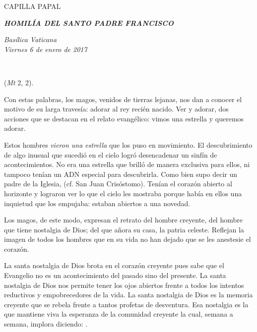CAPILLA PAPAL

\textbf{\emph{HOMILÍA DEL SANTO PADRE FRANCISCO}}

\emph{Basílica Vaticana\\ Viernes 6 de enero de 2017}


~

 (\emph{Mt} 2, 2).

Con estas palabras, los magos, venidos de tierras lejanas, nos dan a conocer el motivo de su larga travesía: adorar al rey recién nacido. Ver y adorar, dos acciones que se destacan en el relato evangélico: vimos una estrella y queremos adorar.

Estos hombres \emph{vieron una estrella} que los puso en movimiento. El descubrimiento de algo inusual que sucedió en el cielo logró desencadenar un sinfín de acontecimientos. No era una estrella que brilló de manera exclusiva para ellos, ni tampoco tenían un ADN especial para descubrirla. Como bien supo decir un padre de la Iglesia,  (cf. San Juan Crisóstomo). Tenían el corazón abierto al horizonte y lograron ver lo que el cielo les mostraba porque había en ellos una inquietud que los empujaba: estaban abiertos a una novedad.

Los magos, de este modo, expresan el retrato del hombre creyente, del hombre que tiene nostalgia de Dios; del que añora su casa, la patria celeste. Reflejan la imagen de todos los hombres que en su vida no han dejado que se les anestesie el corazón.

La santa nostalgia de Dios brota en el corazón creyente pues sabe que el Evangelio no es un acontecimiento del pasado sino del presente. La santa nostalgia de Dios nos permite tener los ojos abiertos frente a todos los intentos reductivos y empobrecedores de la vida. La santa nostalgia de Dios es la memoria creyente que se rebela frente a tantos profetas de desventura. Esa nostalgia es la que mantiene viva la esperanza de la comunidad creyente la cual, semana a semana, implora diciendo: .

